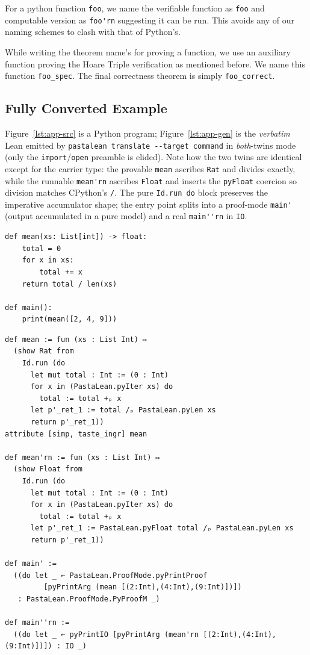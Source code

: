 \documentclass{article}
\newcommand{\code}{\lstinline}
\begin{document}
For a python function \code{foo}, we name the verifiable function as \code{foo} and computable version as \code{foo'rn} suggesting it can be run. This avoids any of our naming schemes to clash with that of Python's.

While writing the theorem name's for proving a function, we use an auxiliary function proving the Hoare Triple verification as mentioned before. We name this function \code{foo_spec}. The final correctness theorem is simply \code{foo_correct}.

\subsection{Fully Converted Example}

\label{app:twins}
Figure~\ref{lst:app-src} is a Python program; Figure~\ref{lst:app-gen} is the \emph{verbatim}
Lean emitted by \code{pastalean translate --target command} in \emph{both}-twins mode (only the
\code{import}/\code{open} preamble is elided). Note how the two twins are identical except for the
carrier type: the provable \code{mean} ascribes \code{Rat} and divides exactly, while the runnable
\code{mean'rn} ascribes \code{Float} and inserts the \code{pyFloat} coercion so division matches
CPython's \code{/}. The pure \code{Id.run do} block preserves the imperative accumulator shape; the
entry point splits into a proof-mode \code{main'} (output accumulated in a pure model) and a real
\code{main''rn} in \code{IO}.

\begin{lstlisting}[style=py,caption={Python source.},label={lst:app-src}]
def mean(xs: List[int]) -> float:
    total = 0
    for x in xs:
        total += x
    return total / len(xs)

def main():
    print(mean([2, 4, 9]))
\end{lstlisting}

\begin{lstlisting}[style=lean,caption={Verbatim generated Lean (provable + runnable twins).},label={lst:app-gen}]
def mean := fun (xs : List Int) ↦
  (show Rat from
    Id.run (do
      let mut total : Int := (0 : Int)
      for x in (PastaLean.pyIter xs) do
        total := total +ₚ x
      let p'_ret_1 := total /ₚ PastaLean.pyLen xs
      return p'_ret_1))
attribute [simp, taste_ingr] mean

def mean'rn := fun (xs : List Int) ↦
  (show Float from
    Id.run (do
      let mut total : Int := (0 : Int)
      for x in (PastaLean.pyIter xs) do
        total := total +ₚ x
      let p'_ret_1 := PastaLean.pyFloat total /ₚ PastaLean.pyLen xs
      return p'_ret_1))

def main' :=
  ((do let _ ← PastaLean.ProofMode.pyPrintProof
         [pyPrintArg (mean [(2:Int),(4:Int),(9:Int)])])
   : PastaLean.ProofMode.PyProofM _)

def main''rn :=
  ((do let _ ← pyPrintIO [pyPrintArg (mean'rn [(2:Int),(4:Int),(9:Int)])]) : IO _)
\end{lstlisting}
\end{document}
